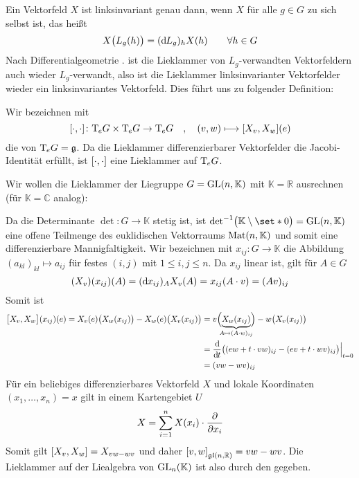 Ein Vektorfeld $X$ ist linksinvariant genau dann, wenn $X$ für alle $g \in G$  zu sich selbst ist, das heißt
\[
	X \enbrace[\big]{L_g(h)} = (\mathd L_g)_h X(h) \qquad  \forall h \in G
\]
Nach Differentialgeometrie . ist die Lieklammer von $L_g$-verwandten Vektorfeldern auch wieder $L_g$-verwandt, also ist die Lieklammer linksinvarianter Vektorfelder wieder ein linksinvariantes Vektorfeld.
Dies führt uns zu folgender Definition:

\begin{definition}[{name=[Liealgebra einer Liegruppe]}]
	Wir bezeichnen mit
	\[
		\benbrace*{\cdot ,\cdot } \colon \Tmap_e G \times \Tmap_e G \to \Tmap_e G \quad ,\quad  (v,w) \longmapsto \benbrace*{X_v,X_w}(e)
	\] 
	die  von $\Tmap_e G = \mathfrak{g}$.
	Da die Lieklammer differenzierbarer Vektorfelder die Jacobi-Identität erfüllt, ist $\benbrace*{\cdot ,\cdot }$ eine Lieklammer auf $\Tmap_e G$.
\end{definition}

\begin{beispiel*}[{name=[{Lieklammer für allgemeine lineare Gruppe}]}]
	Wir wollen die Lieklammer der Liegruppe $G=\GL(n,\mathbb{K})$ mit $\mathbb{K}=\mathbb{R}$ ausrechnen (für $\mathbb{K}=\mathbb{C}$ analog):
	
	Da die Determinante $\det \colon G \to \mathbb{K}$ stetig ist, ist 
	\(
		{\det}^{-1} \enbrace[\big]{\mathbb{K}\setminus \set*{0}} = \GL(n,\mathbb{K}) 
	\)
	eine offene Teilmenge des euklidischen Vektorraums $\Mat(n,\mathbb{K})$ und somit eine differenzierbare Mannigfaltigkeit.
	Wir bezeichnen mit $x_{ij} \colon G \to \mathbb{K}$ die Abbildung $(a_{kl})_{kl} \mapsto a_{ij}$ für festes $(i,j)$ mit $1\le i,j\le n$.
	Da $x_{ij}$ linear ist, gilt für $A \in G$
	\[
		(X_v)(x_{ij})(A) = (\mathd x_{ij})_A X_v(A) = x_{ij}(A \cdot v) = (A v)_{ij}
	\]
	Somit ist
	\begin{align}
		\benbrace[\big]{X_v,X_w}(x_{ij})(e) = X_v(e) \enbrace[\big]{X_w(x_{ij})} - X_w(e) \enbrace[\big]{X_v(x_{ij})} &= v \enbrace[\Big]{\Underbrace{X_w(x_{ij})}{\mathclap{A \mapsto (A \cdot w)_{ij}}}} - w \enbrace[\big]{X_v(x_{ij})} \\
		&= \diffd{}{t} \enbrace[\big]{(ew + t \cdot vw)_{ij} - (ev + t \cdot wv)_{ij}} \Big|_{t=0} \\
		&= (v w- w v)_{ij}
	\end{align}
	Für ein beliebiges differenzierbares Vektorfeld $X$ und lokale Koordinaten $(x_1, \ldots ,x_n)=x$ gilt in einem Kartengebiet $U$
	\[
		X = \sum_{i=1}^{n} X(x_i) \cdot \diff{}{x_i}
	\]
	Somit gilt $\benbrace*{X_v,X_w} =X_{vw -wv}$ und daher $\benbrace*{v,w}_{\mathfrak{gl}(n,\mathbb{R})}=vw -wv$.
	Die Lieklammer auf der Liealgebra von $\GL_n(\mathbb{K})$ ist also durch den  gegeben.
\end{beispiel*}

